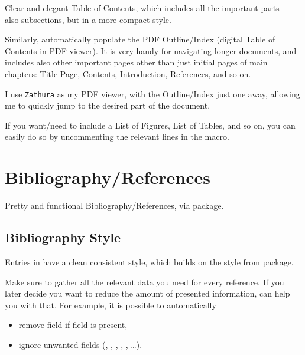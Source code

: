 Clear and elegant Table of Contents, which includes all the important parts --- also  subsections, but in a more compact style.

Similarly, automatically populate the PDF Outline/Index (digital Table of Contents in PDF viewer).
It is very handy for navigating longer documents, and includes also other important pages other than just initial pages of main chapters: Title Page, Contents, Introduction, References, and so on.
\begin{remark}
    I use \texttt{Zathura} as my PDF viewer, with the Outline/Index just one  away, allowing me to quickly jump to the desired part of the document.
\end{remark}

\begin{remark}
    If you want/need to include a List of Figures, List of Tables, and so on, you can easily do so by uncommenting the relevant lines in the \custommacro{\contentsandlists} macro.
\end{remark}


\section{Bibliography/References}%
\label{sec:Bibliography/References}

Pretty and functional Bibliography/References, via  package.

\subsection{Bibliography Style}%
\label{sub:Bibliography Style}

Entries in  have a clean consistent style, which builds on the  style from  package.

\begin{tip}
    Make sure to gather all the relevant data you need for every reference.
    If you later decide you want to reduce the amount of presented information,  can help you with that.
    For example, it is possible to automatically
    \begin{itemize}
        \item remove  field if  field is present,
        \item ignore unwanted fields (, , , , , \ldots). \qedhere*
    \end{itemize}
\end{tip}

